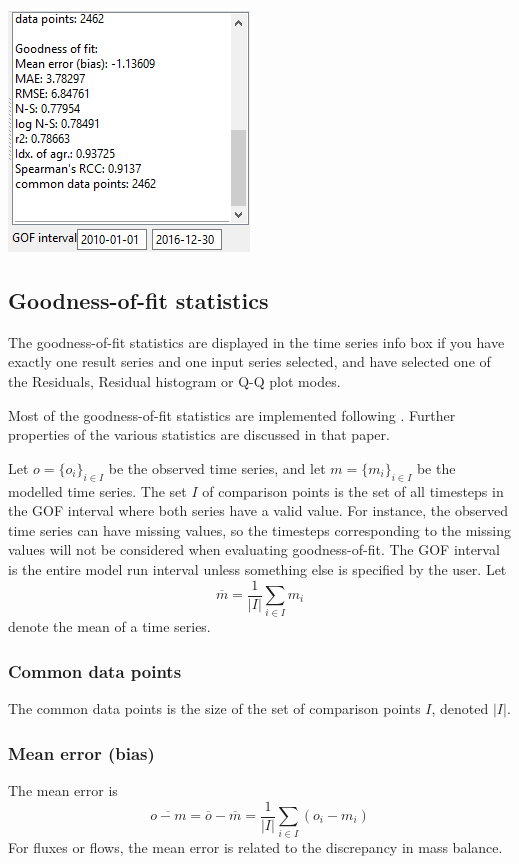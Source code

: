 \documentclass[11pt]{article}
\theoremstyle{definition}
\begin{document}
\begin{center}
\includegraphics[width=0.3\linewidth]{img/scr3}
\end{center}

\subsection{Goodness-of-fit statistics}\label{sec:gof}

The goodness-of-fit statistics are displayed in the time series info box if you have exactly one result series and one input series selected, and have selected one of the Residuals, Residual histogram or Q-Q plot modes. 

Most of the goodness-of-fit statistics are implemented following \cite{krause05}. Further properties of the various statistics are discussed in that paper.

Let $o=\{o_i\}_{i\in I}$ be the observed time series, and let $m=\{m_i\}_{i\in I}$ be the modelled time series. The set $I$ of comparison points is the set of all timesteps in the GOF interval where both series have a valid value. For instance, the observed time series can have missing values, so the timesteps corresponding to the missing values will not be considered when evaluating goodness-of-fit. The GOF interval is the entire model run interval unless something else is specified by the user. Let
\[
\overline{m} = \frac{1}{|I|}\sum_{i\in I}m_i
\]
denote the mean of a time series.

\subsubsection{Common data points}
The common data points is the size of the set of comparison points $I$, denoted $|I|$.

\subsubsection{Mean error (bias)}
The mean error is
\[
\overline{o - m} = \overline{o} -\overline{m} =\frac{1}{|I|} \sum_{i\in I} (o_i - m_i)
\]
For fluxes or flows, the mean error is related to the discrepancy in mass balance.
\end{document}
